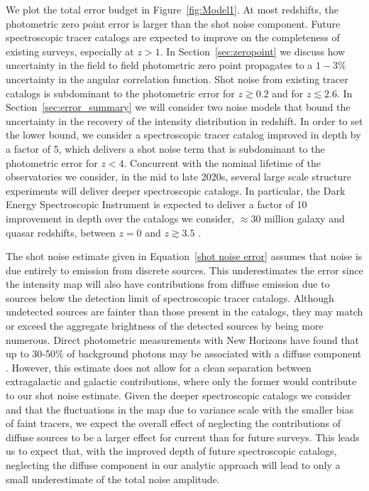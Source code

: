 \documentclass[fleqn,usenatbib]{mnras}
\begin{document}
We plot the total error budget in Figure~\ref{fig:Model1}. At most redshifts, the photometric zero point error is larger than the shot noise component. Future spectroscopic tracer catalogs are expected to improve on the completeness of existing surveys, especially at $z>1$. In Section~\ref{sec:zeropoint} we discuss how uncertainty in the field to field photometric zero point propagates to a $1-3 \%$ uncertainty in the angular correlation function. Shot noise from existing tracer catalogs is subdominant to the photometric error for $z \gtrsim 0.2$ and for $z \lesssim 2.6$.  In Section~\ref{sec:error_summary} we will consider two noise models that bound the uncertainty in the recovery of the intensity distribution in redshift. In order to set the lower bound, we consider a spectroscopic tracer catalog improved in depth by a factor of 5, which delivers a shot noise term that is subdominant to the photometric error for $z<4$. Concurrent with the nominal lifetime of the observatories we consider, in the mid to late 2020s, several large scale structure experiments will deliver deeper spectroscopic catalogs. In particular, the Dark Energy Spectroscopic Instrument is expected to deliver a factor of 10 improvement in depth over the catalogs we consider, $\approx 30$ million galaxy and quasar redshifts, between $z=0$ and $z \gtrsim 3.5$ \citep{collaboration2016desi}.



The shot noise estimate given in Equation~\ref{shot noise error} assumes that noise is due entirely to emission from discrete sources. This underestimates the error since the intensity map will also have contributions from diffuse emission due to sources below the detection limit of spectroscopic tracer catalogs. Although undetected sources are fainter than those present in the catalogs, they may match or exceed the aggregate brightness of the detected sources by being more numerous. Direct photometric measurements with New Horizons have found that up to 30-50$\%$ of background photons may be associated with a diffuse component \citep{lauer2020new}. However, this estimate does not allow for a clean separation between extragalactic and galactic contributions, where only the former would contribute to our shot noise estimate. Given the deeper spectroscopic catalogs we consider and that the fluctuations in the map due to variance scale with the smaller bias of faint tracers, we expect the overall effect of neglecting the contributions of diffuse sources to be a larger effect for current than for future surveys. This leads us to expect that, with the improved depth of future spectroscopic catalogs, neglecting the diffuse component in our analytic approach will lead to only a small underestimate of the total noise amplitude.
\end{document}
